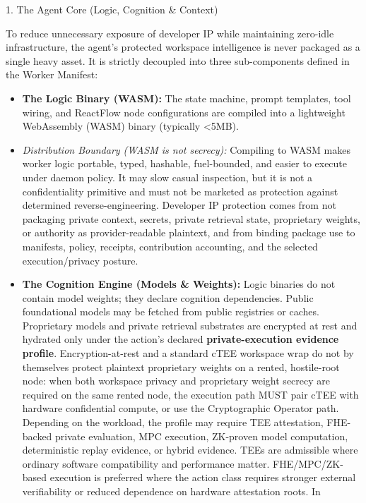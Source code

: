 \documentclass[
  11pt,
]{article}
\providecommand{\tightlist}{%
  \setlength{\itemsep}{0pt}\setlength{\parskip}{0pt}}
\begin{document}
1. The Agent Core (Logic, Cognition \& Context)

To reduce unnecessary exposure of developer IP while maintaining
zero-idle infrastructure, the agent's protected workspace intelligence
is never packaged as a single heavy asset. It is strictly decoupled into
three sub-components defined in the Worker Manifest:

\begin{itemize}
\tightlist
\item
  \textbf{The Logic Binary (WASM):} The state machine, prompt templates,
  tool wiring, and ReactFlow node configurations are compiled into a
  lightweight WebAssembly (WASM) binary (typically \textless5MB).
\item
  \emph{Distribution Boundary (WASM is not secrecy):} Compiling to WASM
  makes worker logic portable, typed, hashable, fuel-bounded, and easier
  to execute under daemon policy. It may slow casual inspection, but it
  is not a confidentiality primitive and must not be marketed as
  protection against determined reverse-engineering. Developer IP
  protection comes from not packaging private context, secrets, private
  retrieval state, proprietary weights, or authority as provider-readable
  plaintext, and from binding package use to manifests, policy,
  receipts, contribution accounting, and the selected execution/privacy
  posture.
\item
  \textbf{The Cognition Engine (Models \& Weights):} Logic binaries do
  not contain model weights; they declare cognition dependencies. Public
  foundational models may be fetched from public registries or caches.
  Proprietary models and private retrieval substrates are encrypted at
  rest and hydrated only under the action's declared
  \textbf{private-execution evidence profile}. Encryption-at-rest and a standard cTEE workspace
  wrap do not by themselves protect plaintext proprietary weights on a
  rented, hostile-root node: when both workspace privacy and proprietary
  weight secrecy are required on the same rented node, the execution
  path MUST pair cTEE with hardware confidential compute, or use the
  Cryptographic Operator path. Depending on the workload, the profile
  may require TEE attestation, FHE-backed private evaluation, MPC
  execution, ZK-proven model computation, deterministic replay evidence,
  or hybrid evidence. TEEs are admissible where ordinary software
  compatibility and performance matter. FHE/MPC/ZK-based execution is
  preferred where the action class requires stronger external
  verifiability or reduced dependence on hardware attestation roots. In

\end{itemize}
\end{document}
